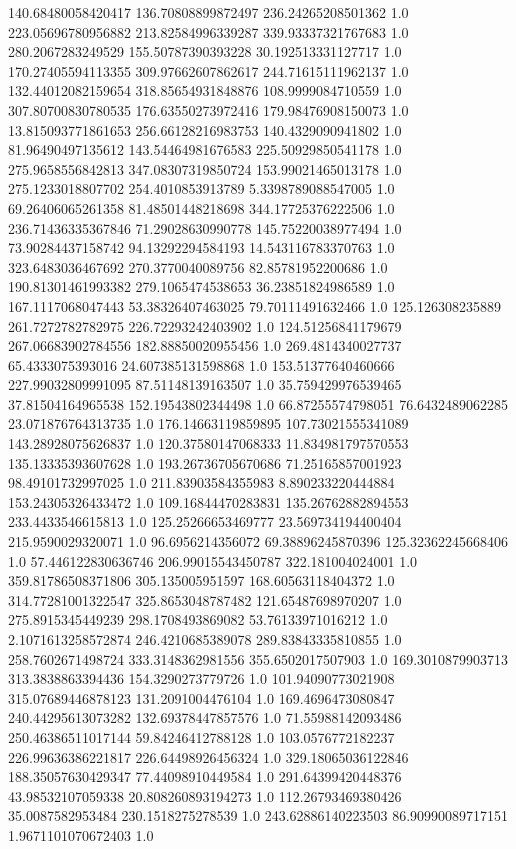 140.68480058420417	136.70808899872497	236.24265208501362	1.0
223.05696780956882	213.82584996339287	339.93337321767683	1.0
280.2067283249529	155.50787390393228	30.192513331127717	1.0
170.27405594113355	309.97662607862617	244.71615111962137	1.0
132.44012082159654	318.85654931848876	108.9999084710559	1.0
307.80700830780535	176.63550273972416	179.98476908150073	1.0
13.815093771861653	256.66128216983753	140.4329090941802	1.0
81.96490497135612	143.54464981676583	225.50929850541178	1.0
275.9658556842813	347.08307319850724	153.99021465013178	1.0
275.1233018807702	254.4010853913789	5.3398789088547005	1.0
69.26406065261358	81.48501448218698	344.17725376222506	1.0
236.71436335367846	71.29028630990778	145.75220038977494	1.0
73.90284437158742	94.13292294584193	14.543116783370763	1.0
323.6483036467692	270.3770040089756	82.85781952200686	1.0
190.81301461993382	279.1065474538653	36.23851824986589	1.0
167.1117068047443	53.38326407463025	79.70111491632466	1.0
125.126308235889	261.7272782782975	226.72293242403902	1.0
124.51256841179679	267.06683902784556	182.88850020955456	1.0
269.4814340027737	65.4333075393016	24.607385131598868	1.0
153.51377640460666	227.99032809991095	87.51148139163507	1.0
35.759429976539465	37.81504164965538	152.19543802344498	1.0
66.87255574798051	76.6432489062285	23.071876764313735	1.0
176.14663119859895	107.73021555341089	143.28928075626837	1.0
120.37580147068333	11.834981797570553	135.13335393607628	1.0
193.26736705670686	71.25165857001923	98.49101732997025	1.0
211.83903584355983	8.890233220444884	153.24305326433472	1.0
109.16844470283831	135.26762882894553	233.4433546615813	1.0
125.25266653469777	23.569734194400404	215.9590029320071	1.0
96.6956214356072	69.38896245870396	125.32362245668406	1.0
57.446122830636746	206.99015543450787	322.181004024001	1.0
359.81786508371806	305.135005951597	168.60563118404372	1.0
314.77281001322547	325.8653048787482	121.65487698970207	1.0
275.8915345449239	298.1708493869082	53.76133971016212	1.0
2.1071613258572874	246.4210685389078	289.83843335810855	1.0
258.7602671498724	333.3148362981556	355.6502017507903	1.0
169.3010879903713	313.3838863394436	154.3290273779726	1.0
101.94090773021908	315.07689446878123	131.2091004476104	1.0
169.4696473080847	240.44295613073282	132.69378447857576	1.0
71.55988142093486	250.46386511017144	59.84246412788128	1.0
103.0576772182237	226.99636386221817	226.64498926456324	1.0
329.18065036122846	188.35057630429347	77.44098910449584	1.0
291.64399420448376	43.98532107059338	20.808260893194273	1.0
112.26793469380426	35.0087582953484	230.1518275278539	1.0
243.62886140223503	86.90990089717151	1.9671101070672403	1.0
